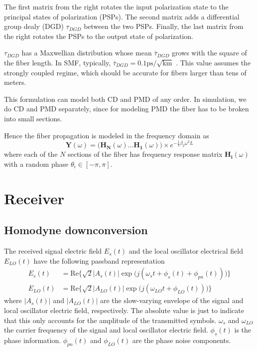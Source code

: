 \documentclass[a4paper]{article}
\begin{document}
The first matrix from the right rotates the input polarization state to the principal states of polarization (PSPs). The second matrix adds a differential group dealy (DGD) $\tau_{DGD}$ between the two PSPs. Finally, the last matrix from the right rotates the PSPs to the output state of polarization.

$\tau_{DGD}$ has a Maxwellian distribution whose mean $\bar{\tau}_{DGD}$ grows with the square of the fiber length. In SMF, typically, $\bar{\tau}_{DGD} = 0.1 \mathrm{ps/\sqrt{km}}$ \cite{Ip2008}. This value assumes the strongly coupled regime, which should be accurate for fibers larger than tens of meters.

This formulation can model both CD and PMD of any order. In simulation, we do CD and PMD separately, since for modeling PMD the fiber has to be broken into small sections.

Hence the fiber propagation is modeled in the frequency domain as
\begin{equation}
\bm{Y}(\omega) = \Big(\bm{H_N}(\omega)\ldots \bm{H_1}(\omega)\Big)\times e^{-\frac{1}{2}\beta_2\omega^2L}
\end{equation}
where each of the $N$ sections of the fiber has frequency response matrix $\bm{H_i}(\omega)$ with a random phase $\theta_i \in [-\pi, \pi]$.
\section{Receiver}
\subsection{Homodyne downconversion}
The received signal electric field $E_s(t)$ and the local oscillator electrical field $E_{LO}(t)$ have the following passband representation
\begin{align}
E_s(t) &= \mathrm{Re}\Big\{\sqrt{2}|A_s(t)|\exp\Big(j(\omega_st + \phi_s(t) + \phi_{pn}(t))\Big)\Big\} \\
E_{LO}(t) &= \mathrm{Re}\Big\{\sqrt{2}|A_{LO}(t)|\exp\Big(j(\omega_{LO}t + \phi_{LO}(t))\Big)\Big\}
\end{align}
where $|A_s(t)|$ and $|A_{LO}(t)|$ are the slow-varying envelope of the signal and local oscillator electric field, respectively. The absolute value is just to indicate that this only accounts for the amplitude of the transmitted symbols. $\omega_s$ and $\omega_{LO}$ the carrier frequency of the signal and local oscillator electric field. $\phi_s(t)$ is the phase information. $\phi_{pn}(t)$ and $\phi_{LO}(t)$ are the phase noise components.
\end{document}
